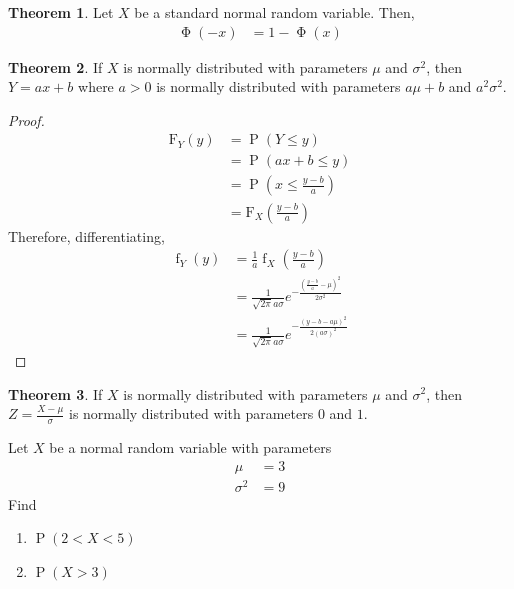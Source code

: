 \documentclass[titlepage, fleqn, a4paper, 12pt, twoside]{article}
\theoremstyle{definition}
\theoremstyle{theorem}
\newtheorem{theorem}{Theorem}
\DeclareMathOperator{\prob}{\mathrm{P}}
\DeclareMathOperator{\pdf}{\mathrm{f}}
\DeclareMathOperator{\stdnormalcdf}{\mathrm{\Phi}}
\newcommand*{\cdf}[1]{\mathrm{F}_{#1}}
\begin{document}
\begin{theorem}
	Let $X$ be a standard normal random variable.
	Then,
	\begin{align*}
		\stdnormalcdf(-x) &= 1 - \stdnormalcdf(x)
	\end{align*}
\end{theorem}

\begin{theorem}
	If $X$ is normally distributed with parameters $\mu$ and $\sigma^2$, then $Y = a x + b$ where $a > 0$ is normally distributed with parameters $a \mu + b$ and $a^2 \sigma^2$.
\end{theorem}

\begin{proof}
	\begin{align*}
		\cdf{Y}(y) &= \prob(Y \le y)\\
		&= \prob(a x + b \le y)\\
		&= \prob\left( x \le \frac{y - b}{a} \right)\\
		&= \cdf{X}\left( \frac{y - b}{a} \right)
	\end{align*}
	Therefore, differentiating,
	\begin{align*}
		\pdf_Y(y) &= \frac{1}{a} \pdf_X\left( \frac{y - b}{a} \right)\\
		&= \frac{1}{\sqrt{2 \pi} a \sigma} e^{-\frac{\left( \frac{y - b}{a} - \mu \right)^2}{2 \sigma^2}}\\
		&= \frac{1}{\sqrt{2 \pi} a \sigma} e^{-\frac{(y - b - a \mu)^2}{2 (a \sigma)^2}}
	\end{align*}
\end{proof}

\begin{theorem}
	If $X$ is normally distributed with parameters $\mu$ and $\sigma^2$, then $Z = \frac{X - \mu}{\sigma}$ is normally distributed with parameters $0$ and $1$.
\end{theorem}

\begin{question}
	Let $X$ be a normal random variable with parameters
	\begin{align*}
		\mu &= 3\\
		\sigma^2 &= 9
	\end{align*}
	Find
	\begin{enumerate}
		\item $\prob(2 < X < 5)$
		\item $\prob(X > 3)$
	\end{enumerate}
\end{question}
\end{document}
